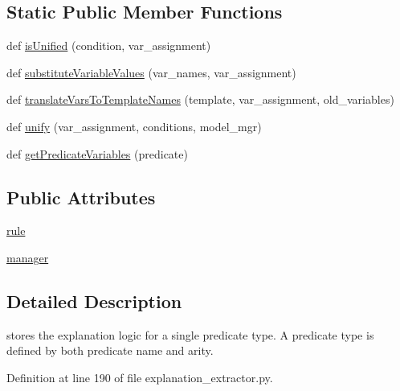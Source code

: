 \subsection*{Static Public Member Functions}
\begin{DoxyCompactItemize}
\item 
def \hyperlink{classexplanation__extractor_1_1_explanation_template_a6dee7209b093a86ecc6b5bae18d458bc}{is\+Unified} (condition, var\+\_\+assignment)
\item 
def \hyperlink{classexplanation__extractor_1_1_explanation_template_a5d5da10c74e21a3038b128a3bcb3b9de}{substitute\+Variable\+Values} (var\+\_\+names, var\+\_\+assignment)
\item 
def \hyperlink{classexplanation__extractor_1_1_explanation_template_a9a57971dfdabe76fbc752548bcf095f4}{translate\+Vars\+To\+Template\+Names} (template, var\+\_\+assignment, old\+\_\+variables)
\item 
def \hyperlink{classexplanation__extractor_1_1_explanation_template_ad14ac7b106c4c8822678bd9bfbcf0b17}{unify} (var\+\_\+assignment, conditions, model\+\_\+mgr)
\item 
def \hyperlink{classexplanation__extractor_1_1_explanation_template_a47d50adeccec8141590eb51a9694219f}{get\+Predicate\+Variables} (predicate)
\end{DoxyCompactItemize}
\subsection*{Public Attributes}
\begin{DoxyCompactItemize}
\item 
\hyperlink{classexplanation__extractor_1_1_explanation_template_a4c4f2a6dd654e3aaa157970cc2c7bc21}{rule}
\item 
\hyperlink{classexplanation__extractor_1_1_explanation_template_a2f5ae7f61f258fd2d7d00aa9c21dcf39}{manager}
\end{DoxyCompactItemize}


\subsection{Detailed Description}
\begin{DoxyVerb}stores the explanation logic for a single predicate type. A predicate type
is defined by both predicate name and arity.\end{DoxyVerb}
 

Definition at line 190 of file explanation\+\_\+extractor.\+py.




